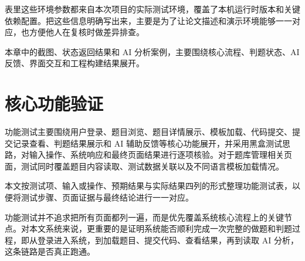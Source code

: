 表里这些环境参数都来自本次项目的实际测试环境，覆盖了本机运行时版本和关键依赖配置。把这些信息明确写出来，主要是为了让论文描述和演示环境能够一一对应，也方便他人在复核时做差异排查。

本章中的截图、状态返回结果和 AI 分析案例，主要围绕核心流程、判题状态、AI 反馈、界面交互和工程构建结果展开。

\section{核心功能验证}

功能测试主要围绕用户登录、题目浏览、题目详情展示、模板加载、代码提交、提交记录查看、判题结果展示和 AI 辅助反馈等核心功能展开，并采用黑盒测试思路，对输入操作、系统响应和最终页面结果进行逐项核验。对于题库管理相关页面，测试同时覆盖题目内容读取、测试数据关联以及不同语言模板加载情况。

本文按测试项、输入或操作、预期结果与实际结果四列的形式整理功能测试表，以便将测试步骤、页面证据与最终结论进行一一对应。

功能测试并不追求把所有页面都列一遍，而是优先覆盖系统核心流程上的关键节点。对本文系统来说，更重要的是证明系统能否顺利完成一次完整的做题和判题过程，即从登录进入系统，到加载题目、提交代码、查看结果，再到读取 AI 分析，这条链路是否真正跑通。

